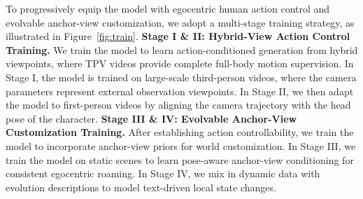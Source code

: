 To progressively equip the model with egocentric human action control and evolvable anchor-view customization, we adopt a multi-stage training strategy, as illustrated in Figure~\ref{fig:train}. 
%
\textbf{Stage I \& II: Hybrid-View Action Control Training.}
We train the model to learn action-conditioned generation from hybrid viewpoints, where TPV videos provide complete full-body motion supervision.
In Stage I, the model is trained on large-scale third-person videos, where the camera parameters represent external observation viewpoints.
In Stage II, we then adapt the model to first-person videos by aligning the camera trajectory with the head pose of the character.
%
\textbf{Stage III \& IV: Evolvable Anchor-View Customization Training.}
After establishing action controllability, we train the model to incorporate anchor-view priors for world customization.
In Stage III, we train the model on static scenes to learn pose-aware anchor-view conditioning for consistent egocentric roaming.
In Stage IV, we mix in dynamic data with evolution descriptions to model text-driven local state changes.




